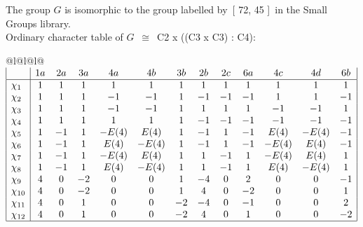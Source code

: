 \documentclass[varwidth=\maxdimen,border=10]{standalone}
\begin{document}
The group $G$ is isomorphic to the group labelled by\ [ 72, 45 ]\ in the Small Groups library.\\
Ordinary character table of $G$\ $\cong$\ C2 x ((C3 x C3) : C4):\\
\begin{center}
\begin{tabular}{@{}l@{}l@{}l@{}}
\hline
\(\begin{array}{|l|cccccccccccc|}
  & 1a & 2a & 3a & 4a & 4b & 3b & 2b & 2c & 6a & 4c & 4d & 6b\\ \hline
\chi_{1} & 1 & 1 & 1 & 1 & 1 & 1 & 1 & 1 & 1 & 1 & 1 & 1\\
\chi_{2} & 1 & 1 & 1 & -1 & -1 & 1 & -1 & -1 & -1 & 1 & 1 & -1\\
\chi_{3} & 1 & 1 & 1 & -1 & -1 & 1 & 1 & 1 & 1 & -1 & -1 & 1\\
\chi_{4} & 1 & 1 & 1 & 1 & 1 & 1 & -1 & -1 & -1 & -1 & -1 & -1\\
\chi_{5} & 1 & -1 & 1 & -E(4) & E(4) & 1 & -1 & 1 & -1 & E(4) & -E(4) & -1\\
\chi_{6} & 1 & -1 & 1 & E(4) & -E(4) & 1 & -1 & 1 & -1 & -E(4) & E(4) & -1\\
\chi_{7} & 1 & -1 & 1 & -E(4) & E(4) & 1 & 1 & -1 & 1 & -E(4) & E(4) & 1\\
\chi_{8} & 1 & -1 & 1 & E(4) & -E(4) & 1 & 1 & -1 & 1 & E(4) & -E(4) & 1\\
\chi_{9} & 4 & 0 & -2 & 0 & 0 & 1 & -4 & 0 & 2 & 0 & 0 & -1\\
\chi_{10} & 4 & 0 & -2 & 0 & 0 & 1 & 4 & 0 & -2 & 0 & 0 & 1\\
\chi_{11} & 4 & 0 & 1 & 0 & 0 & -2 & -4 & 0 & -1 & 0 & 0 & 2\\
\chi_{12} & 4 & 0 & 1 & 0 & 0 & -2 & 4 & 0 & 1 & 0 & 0 & -2\\
\hline
\end{array}\)\\
\end{tabular}
\end{center}
\end{document}
